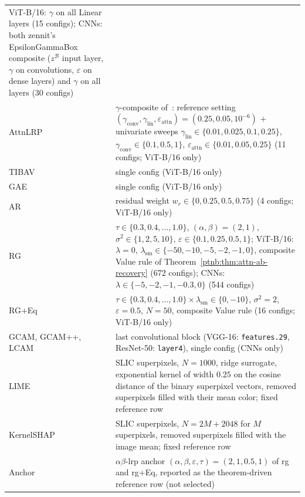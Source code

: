 \begin{table}[htbp]
{\begin{tabularx}{\linewidth}{@{}l >{\raggedright\arraybackslash}X@{}}
        ViT-B/16: $\gamma$ on all Linear layers (15 configs); CNNs: both zennit's EpsilonGammaBox composite
        ($z^{\mathcal{B}}$ input layer, $\gamma$ on convolutions, $\varepsilon$ on dense layers) and
        $\gamma$ on all layers (30 configs) \\
        AttnLRP & $\gamma$-composite of~\textcite{Achtibat2024AttnLRP}: reference setting
        $(\gamma_{\text{conv}}, \gamma_{\text{lin}}, \varepsilon_{\text{attn}}){=}(0.25, 0.05, 10^{-6})$ +
        univariate sweeps $\gamma_{\text{lin}}\in\{0.01, 0.025, 0.1, 0.25\}$,
        $\gamma_{\text{conv}}\in\{0.1, 0.5, 1\}$, $\varepsilon_{\text{attn}}\in\{0.01, 0.05,
            0.25\}$ \quad (11 configs; ViT-B/16 only) \\
        TIBAV & single config \quad (ViT-B/16 only) \\
        GAE & single config \quad (ViT-B/16 only) \\
        AR & residual weight $w_r \in \{0, 0.25, 0.5, 0.75\}$ \quad (4 configs; ViT-B/16 only) \\
        RG & $\tau \in \{0.3, 0.4, \ldots, 1.0\}$, $(\alpha,\beta){=}(2,1)$, $\sigma^2 \in \{1, 2, 5,
            10\}$, $\varepsilon \in \{0.1, 0.25, 0.5, 1\}$; ViT-B/16: $\lambda{=}0$, $\lambda_{\mathrm{sm}} \in
            \{-50, -10, -5, -2, -1, 0\}$, composite Value rule of Theorem~\ref{ptnb:thm:attn-ab-recovery} (672
        configs); CNNs: $\lambda \in \{-5, -2, -1, -0.3, 0\}$ (544 configs) \\
        RG+Eq & $\tau \in \{0.3, 0.4, \ldots, 1.0\} \times \lambda_{\mathrm{sm}} \in \{0, -10\}$,
        $\sigma^2{=}2$, $\varepsilon{=}0.5$, $N{=}50$, composite Value rule \quad (16 configs; ViT-B/16
        only) \\
        GCAM, GCAM++, LCAM & last convolutional block (VGG-16: \texttt{features.29}, ResNet-50:
        \texttt{layer4}), single config \quad (CNNs only) \\
        LIME & 80 SLIC superpixels, $N{=}1000$, ridge surrogate, exponential kernel of width $0.25$ on the
        cosine distance of the binary superpixel vectors, removed superpixels filled with their mean color;
        fixed reference row \\
        KernelSHAP & 80 SLIC superpixels, $N{=}2M{+}2048$ for $M$ superpixels, removed superpixels filled with
        the image mean; fixed reference row \\
        Anchor & $\alpha\beta$-\ac{lrp} anchor $(\alpha,\beta,\varepsilon,\tau){=}(2,1,0.5,1)$ of \ac{rg}
        and \ac{rg}+Eq, reported as the theorem-driven reference row (not selected) \\
        \bottomrule
    \end{tabularx}
}%
\end{table}

